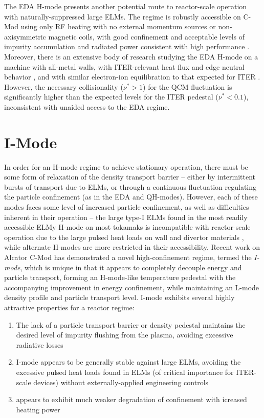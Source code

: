 The EDA H-mode presents another potential route to reactor-scale operation with naturally-suppressed large ELMs.  The regime is robustly accessible on C-Mod using only RF heating with no external momentum sources or non-axisymmetric magnetic coils, with good confinement and acceptable levels of impurity accumulation and radiated power consistent with high performance \cite{Hughes2011}.  Moreover, there is an extensive body of research studying the EDA H-mode on a machine with all-metal walls, with ITER-relevant heat flux and edge neutral behavior \cite{Hubbard2007,Greenwald2007}, and with similar electron-ion equilibration to that expected for ITER \cite{McDermott2009a}.  However, the necessary collisionality ($\nu^* > 1$) for the QCM fluctuation is significantly higher than the expected levels for the ITER pedestal ($\nu^* < 0.1$), inconsistent with unaided access to the EDA regime.\nicesectionending

\section{I-Mode}\label{sec:hcr_imode}

In order for an H-mode regime to achieve stationary operation, there must be some form of relaxation of the density transport barrier -- either by intermittent bursts of transport due to ELMs, or through a continuous fluctuation regulating the particle confinement (as in the EDA and QH-modes).  However, each of these modes faces some level of increased particle confinement, as well as difficulties inherent in their operation -- the large type-I ELMs found in the most readily accessible ELMy H-mode on most tokamaks is incompatible with reactor-scale operation due to the large pulsed heat loads on wall and divertor materials \cite{Federici2003,Loarte2003}, while alternate H-modes are more restricted in their accessibility.  Recent work on Alcator C-Mod has demonstrated a novel high-confinement regime, termed the \emph{I-mode}, which is unique in that it appears to completely decouple energy and particle transport, forming an H-mode-like temperature pedestal with the accompanying 
improvement in energy confinement, while maintaining an L-mode density profile and particle transport level.  I-mode exhibits several highly attractive properties for a reactor regime:

\begin{enumerate}
 \item The lack of a particle transport barrier or density pedestal maintains the desired level of impurity flushing from the plasma, avoiding excessive radiative losses
 \item I-mode appears to be generally stable against large ELMs, avoiding the excessive pulsed heat loads found in ELMs (of critical importance for ITER-scale devices) without externally-applied engineering controls
 \item appears to exhibit much weaker degradation of confinement with icreased heating power
\end{enumerate}

